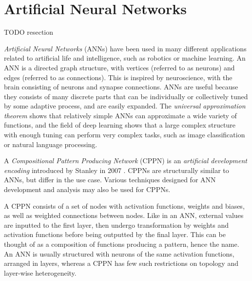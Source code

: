 \section{Artificial Neural Networks}
TODO resection

\textit{Artificial Neural Networks} (ANNs) \cite[Chapter 1]{bengio2015deep} have been used in many different applications related to artificial life and intelligence, such as robotics or machine learning.
An ANN is a directed graph structure, with vertices (referred to as neurons) and edges (referred to as connections).
This is inspired by neuroscience, with the brain consisting of neurons and synapse connections.
ANNs are useful because they consists of many discrete parts that can be individually or collectively tuned by some adaptive process,
and are easily expanded.
The \textit{universal approximation theorem} \cite{Hornik1989359} shows that relatively simple ANNs can approximate a wide variety of functions,
and the field of deep learning shows that a large complex structure with enough tuning can perform very complex tasks, such as image classification or natural language processing.

A \textit{Compositional Pattern Producing Network} (CPPN) is an \textit{artificial development encoding} introduced by Stanley in 2007 \cite{stanley-2007}.
CPPNs are structurally similar to ANNs, but differ in the use case.
Various techniques designed for ANN development and analysis may also be used for CPPNs.

A CPPN consists of a set of nodes with activation functions, weights and biases, as well as weighted connections between nodes.
Like in an ANN, external values are inputted to the first layer, then undergo transformation by weights and activation functions before being outputted by the final layer.
This can be thought of as a composition of functions producing a pattern, hence the name.
An ANN is usually structured with neurons of the same activation functions,
arranged in layers,
whereas a CPPN has few such restrictions on topology and layer-wise heterogeneity.


